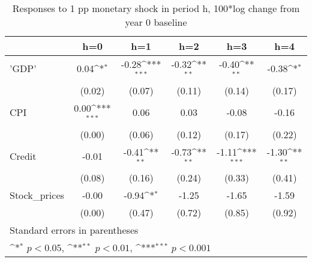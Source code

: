 \begin{table}[htbp]\centering
\def\sym#1{\ifmmode^{#1}\else\(^{#1}\)\fi}
\caption{Responses to 1 pp monetary shock in period h, 100*log change from year 0 baseline}
\begin{tabular}{l*{5}{c}}
\hline\hline
            &\multicolumn{1}{c}{h=0}&\multicolumn{1}{c}{h=1}&\multicolumn{1}{c}{h=2}&\multicolumn{1}{c}{h=3}&\multicolumn{1}{c}{h=4}\\
\hline
'GDP'       &        0.04\sym{*}  &       -0.28\sym{***}&       -0.32\sym{**} &       -0.40\sym{**} &       -0.38\sym{*}  \\
            &      (0.02)         &      (0.07)         &      (0.11)         &      (0.14)         &      (0.17)         \\
[1em]
CPI         &        0.00\sym{***}&        0.06         &        0.03         &       -0.08         &       -0.16         \\
            &      (0.00)         &      (0.06)         &      (0.12)         &      (0.17)         &      (0.22)         \\
[1em]
Credit      &       -0.01         &       -0.41\sym{**} &       -0.73\sym{**} &       -1.11\sym{***}&       -1.30\sym{**} \\
            &      (0.08)         &      (0.16)         &      (0.24)         &      (0.33)         &      (0.41)         \\
[1em]
Stock\_prices&       -0.00         &       -0.94\sym{*}  &       -1.25         &       -1.65         &       -1.59         \\
            &      (0.00)         &      (0.47)         &      (0.72)         &      (0.85)         &      (0.92)         \\
\hline\hline
\multicolumn{6}{l}{\footnotesize Standard errors in parentheses}\\
\multicolumn{6}{l}{\footnotesize \sym{*} \(p<0.05\), \sym{**} \(p<0.01\), \sym{***} \(p<0.001\)}\\
\end{tabular}
\end{table}
